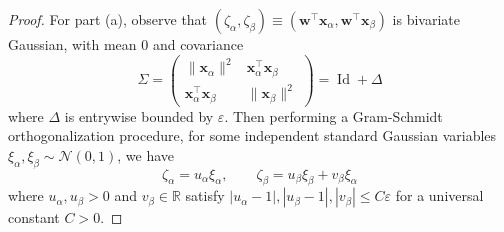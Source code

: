 \documentclass{article}
\theoremstyle{definition}
\newcommand{\R}{\mathbb{R}}
\newcommand{\N}{\mathcal{N}}
\newcommand{\Id}{\operatorname{Id}}
\newcommand{\x}{\mathbf{x}}
\newcommand{\w}{\mathbf{w}}
\renewcommand{\a}{\alpha}
\renewcommand{\b}{\beta}
\newcommand{\eps}{\varepsilon}
\newcommand{\1}{\mathbf{1}}
\begin{document}
\begin{proof}
For part (a), observe that $(\zeta_\a,\zeta_\b) \equiv
(\w^\top \x_\a,\w^\top \x_\b)$ is bivariate
Gaussian, with mean 0 and covariance
\[\Sigma=\begin{pmatrix} \|\x_\a\|^2 & \x_\a^\top \x_\b \\
\x_\a^\top \x_\b & \|\x_\b\|^2 \end{pmatrix}=\Id+\Delta\]
where $\Delta$ is entrywise bounded by $\eps$. Then  performing a Gram-Schmidt
orthogonalization procedure, for some independent standard Gaussian
variables $\xi_\a,\xi_\b \sim \N(0,1)$, we have
\begin{equation}\label{eq:gramschmidt}
\zeta_\a=u_\a \xi_\a, \qquad \zeta_\b=u_\b \xi_\b+v_\b \xi_\a
\end{equation}
where $u_\a,u_\b>0$ and $v_\b \in \R$ satisfy
$|u_\a-1|,|u_\b-1|,|v_\b| \leq C\eps$ for a universal constant $C>0$.


\end{proof}
\end{document}
